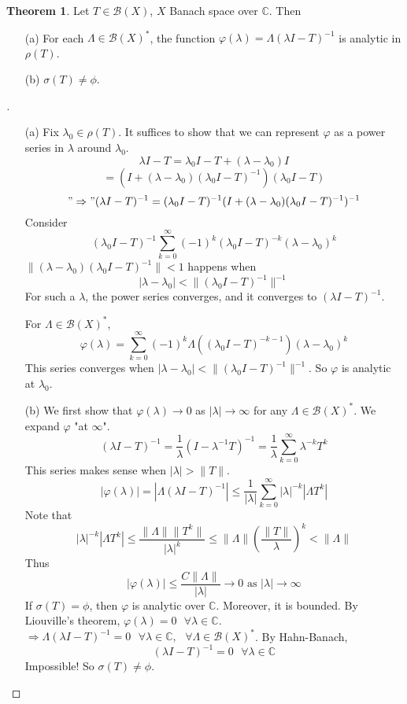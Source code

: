 \documentclass{article}
\theoremstyle{definition}
\newtheorem{thm}{Theorem}
\newenvironment{proofs}[1][\proofname]{%
  \begin{proof}[#1]$ $\par\nobreak\ignorespaces
}{%
  \end{proof}
}
\newcommand{\sfa}{\text{  } \forall}
\begin{document}
\begin{thm}
	Let $T \in \mathcal{B}(X)$, $X$ Banach space over $\mathbb{C}$.
	Then 
	\begin{enumerate}
		\item[(a)] For each $\Lambda \in \mathcal{B}(X)^*$, the function $\varphi (\lambda) = \Lambda (\lambda I - T)^{-1}$ is analytic in $\rho(T)$.

		\item[(b)] $\sigma(T) \neq \phi$.
	\end{enumerate}
\end{thm}

\begin{proofs}
	\begin{enumerate}
		\item[(a)] Fix $\lambda_0 \in \rho(T)$.
			It suffices to show that we can represent $\varphi$ as a power series in $\lambda$ around $\lambda_0$.
			\[
				\lambda I - T = \lambda_0 I - T + (\lambda - \lambda_0) I
			\]
			\[
				= (I + (\lambda - \lambda_0)(\lambda_0 I - T)^{-1})(\lambda_0 I - T)
			\]
			\[
				"\Rightarrow" (\lambda I - T)^{-1} = (\lambda_0 I - T)^{-1} (I + (\lambda - \lambda_0)(\lambda_0 I - T)^{-1})^{-1}
			\]
			Consider
			\[
				(\lambda_0 I - T)^{-1} \sum_{k = 0}^\infty (-1)^k (\lambda_0 I - T)^{-k} (\lambda - \lambda_0)^k
			\]
			$\|(\lambda - \lambda_0)(\lambda_0 I - T)^{-1}\| < 1$ happens when 
			\[
				|\lambda - \lambda_0| < \|(\lambda_0 I - T)^{-1}\|^{-1}
			\]
			For such a $\lambda$, the power series converges, and it converges to $(\lambda I - T)^{-1}$.
			\par For $\Lambda \in \mathcal{B}(X)^*$, 
			\[
				\varphi(\lambda) = \sum_{k = 0}^\infty (-1)^k \Lambda ((\lambda_0 I - T)^{-k - 1})(\lambda - \lambda_0)^k
			\]
			This series converges when $|\lambda - \lambda_0| < \|(\lambda_0 I - T)^{-1}\|^{-1}$.
			So $\varphi$ is analytic at $\lambda_0$.

		\item[(b)] We first show that $\varphi(\lambda) \to 0$ as $|\lambda| \to \infty$ for any $\Lambda \in \mathcal{B}(X)^*$.
			We expand $\varphi$ "at $\infty$".
			\[
				(\lambda I - T)^{-1} = \frac{1}{\lambda}(I - \lambda^{-1} T)^{-1} = \frac{1}{\lambda} \sum_{k = 0}^\infty \lambda^{-k} T^k
			\]
			This series makes sense when $|\lambda| > \|T\|$.
			\[
				|\varphi(\lambda)| = |\Lambda(\lambda I - T)^{-1}| \leq \frac{1}{|\lambda|} \sum_{k = 0}^\infty |\lambda|^{-k}|\Lambda T^k|
			\]
			Note that 
			\[
				|\lambda|^{-k} |\Lambda T^k| \leq \frac{\|\Lambda\| \|T^k\|}{|\lambda|^k} \leq \|\Lambda\| \left(\frac{\|T\|}{\lambda}\right)^k < \|\Lambda\|
			\]
			Thus
			\[
				|\varphi(\lambda)| \leq \frac{C\|\Lambda\|}{|\lambda|} \to 0 \text{ as } |\lambda| \to \infty
			\]
			If $\sigma(T) = \phi$, then $\varphi$ is analytic over $\mathbb{C}$.
			Moreover, it is bounded.
			By Liouville's theorem, $\varphi(\lambda) = 0 \sfa \lambda \in \mathbb{C}$.
			$\Rightarrow \Lambda(\lambda I - T)^{-1} = 0 \sfa \lambda \in \mathbb{C}, \sfa \Lambda \in \mathcal{B}(X)^*$.
			By Hahn-Banach,
			\[
				(\lambda I - T)^{-1} = 0 \sfa \lambda \in \mathbb{C}
			\]
			Impossible!
			So $\sigma(T) \neq \phi$.
	\end{enumerate}
\end{proofs}
\end{document}
